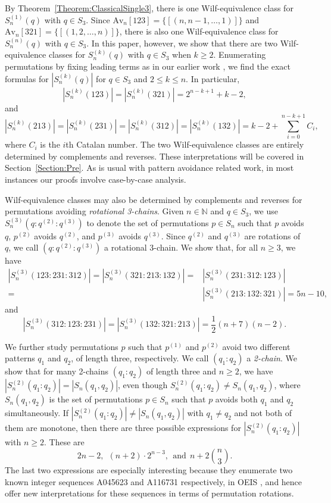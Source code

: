 \documentclass[10pt,a4paper]{amsart}
\newcommand{\half}{{\textstyle\frac12}}
\numberwithin{equation}{section}
\begin{document}
By Theorem~\ref{Theorem:ClassicalSingle3}, there is one Wilf-equivalence class for $S_n^{(1)}(q)$ with $q\in S_3$. 
Since $\text{Av}_n[123]=\{[(n,n-1,\ldots,1)]\}$ and $
\text{Av}_n[321]=\{[(1,2,\ldots,n)]\}$, there is also one Wilf-equivalence class for $S_n^{(n)}(q)$ with $q\in S_3$. In this paper, however, we show that there are two Wilf-equivalence classes for $S_n^{(k)}(q)$ with $q\in S_3$ when $k\geq2$. 
Enumerating permutations by fixing leading terms as in our earlier work \cite{EGY2026}, 
we find the exact formulas for $|S_n^{(k)}(q)|$ for $q\in S_3$ and $2\leq k\leq n$. In particular,
\[
|S_n^{(k)}(123)|=|S_n^{(k)}(321)|=2^{n-k+1}+k-2,
\]
and
\[
|S_n^{(k)}(213)|=|S_n^{(k)}(231)|=|S_n^{(k)}(312)|=|S_n^{(k)}(132)|=k-2+\sum_{i=0}^{n-k+1}C_i,
\]
where $C_i$ is the $i$th Catalan number. The two Wilf-equivalence classes are entirely determined by complements 
and reverses. These interpretations will be covered in Section~\ref{Section:Pre}. As is usual with pattern avoidance related work, in most instances our proofs involve case-by-case analysis.

Wilf-equivalence classes may also be determined by complements and reverses for permutations avoiding {\it rotational 3-chains}. Given $n\in\mathbb{N}$ and $q\in S_3$, we use $S_n^{(3)}(q:q^{(2)}:q^{(3)})$ to denote the set of permutations $p\in S_n$ such that $p$ avoids $q$, $p^{(2)}$ avoids $q^{(2)}$, and $p^{(3)}$ avoids $q^{(3)}$. Since $q^{(2)}$ and $q^{(3)}$ are rotations of $q$, we call $(q:q^{(2)}:q^{(3)})$ a rotational 3-chain. We show that, for all $n\geq3$, we have
\[
\begin{split}
    |S_n^{(3)}(123:231:312)|=|S_n^{(3)}(321:213:132)|=&|S_n^{(3)}(231:312:123)|\\=&|S_n^{(3)}(213:132:321)|=5n-10,
\end{split}
\]
and
\[
    |S_n^{(3)}(312:123:231)|=|S_n^{(3)}(132:321:213)|=\half (n+7)(n-2).
\]

We further study permutations $p$ such that $p^{(1)}$ and $p^{(2)}$ avoid two different patterns $q_1$ and $q_2$, of length three, respectively. We call $(q_1:q_2)$ a \textit{2-chain}. 
We show that for many 2-chains $(q_1:q_2)$ of length three and $n\geq2$, we have $|S_n^{(2)}(q_1:q_2)|=|S_n(q_1,q_2)|$, 
even though $S_n^{(2)}(q_1:q_2)\neq S_n(q_1,q_2)$, where $S_n(q_1,q_2)$ is the set of permutations $p\in S_n$ such that $p$ avoids both $q_1$ and $q_2$ simultaneously. If $|S_n^{(2)}(q_1:q_2)|\neq |S_n(q_1,q_2)|$ with $q_1\neq q_2$ and not both of them are monotone, then there are three possible expressions for $|S_n^{(2)}(q_1:q_2)|$ with $n\geq2$. 
These are 
\[
2n-2, ~~(n+2)\cdot2^{n-3}, ~~\mbox{and} ~~ n + 2 \binom{n}{3}. 
\]
The last two expressions are especially interesting because they enumerate two known 
integer sequences A045623 and A116731 respectively, in OEIS \cite{OEIS}, and hence offer new interpretations 
for these sequences in terms of permutation rotations.
\end{document}
